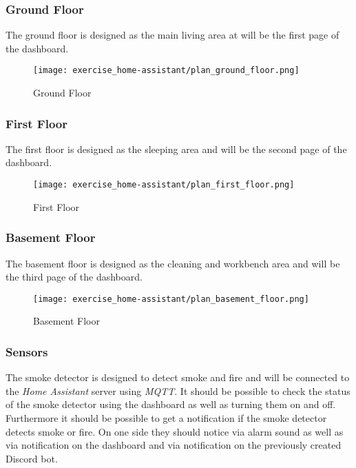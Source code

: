 \subsubsection{Ground Floor}
The ground floor is designed as the main living area at will be the first page of the dashboard.

\begin{figure}[H]
    \centering
    \texttt{[image: exercise\_home-assistant/plan\_ground\_floor.png]}
    \caption{Ground Floor}
    \label{fig:ground_floor}
\end{figure}

\subsubsection{First Floor}
The first floor is designed as the sleeping area and will be the second page of the dashboard.

\begin{figure}[H]
    \centering
    \texttt{[image: exercise\_home-assistant/plan\_first\_floor.png]}
    \caption{First Floor}
    \label{fig:first_floor}
\end{figure}

\subsubsection{Basement Floor}
The basement floor is designed as the cleaning and workbench area and will be the third page of the dashboard.

\begin{figure}[H]
    \centering
    \texttt{[image: exercise\_home-assistant/plan\_basement\_floor.png]}
    \caption{Basement Floor}
    \label{fig:basement_floor}
\end{figure}

\subsubsection{Sensors}

The smoke detector is designed to detect smoke and fire and will be connected to the \textit{Home Assistant} server 
using \textit{MQTT}. It should be possible to check the status of the smoke detector using the dashboard as well as 
turning them on and off. Furthermore it should be possible to get a notification if the smoke detector detects smoke or 
fire. On one side they should notice via alarm sound as well as via notification on the dashboard and via notification 
on the previously created Discord bot.

